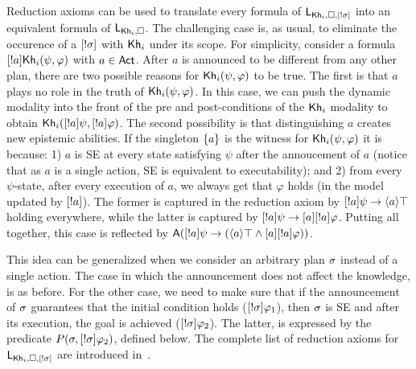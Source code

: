 Reduction axioms can be used to translate every formula of $\mathsf{L}_{{\sf Kh}_i,\square,[!\sigma]}$ into an equivalent formula of $\mathsf{L}_{{\sf Kh}_i,\square}$. The challenging case is, as usual, to eliminate the occurence of a $[!\sigma]$ with ${\sf Kh}_i$ under its scope. For simplicity, consider a formula $[!a]{\sf Kh}_i(\psi,\varphi)$ with $a\in{\rm \sf Act}$. After $a$ is announced to be different from any other plan, there are two possible reasons for ${\sf Kh}_i(\psi,\varphi)$ to be true. The first is that $a$ plays no role in the truth of ${\sf Kh}_i(\psi,\varphi)$. In this case, we can push the dynamic modality into the front of the pre and post-conditions of the ${\sf Kh}_i$ modality to obtain ${\sf Kh}_i([!a]\psi,[!a]\varphi)$. The second possibility is that distinguishing $a$ creates new epistemic abilities. If the singleton $\{ a \}$ is the witness for ${\sf Kh}_i(\psi,\varphi)$ it is because: 1) $a$ is SE at every state satisfying $\psi$ after the annoucement of $a$ (notice that as $a$ is a single action, SE is equivalent to executability); and 2) from every $\psi$-state, after every execution of $a$, we always get that $\varphi$ holds (in the model updated by $[!a]$). The former is captured in the reduction axiom by $[!a]\psi \rightarrow \langle a \rangle\top$ holding everywhere, while the latter is captured by $[!a]\psi \rightarrow [a][!a]\varphi$. Putting all together, this case is reflected by ${\sf A}([!a]\psi\rightarrow(\langle a \rangle\top\wedge[a][!a]\varphi))$.

This idea can be generalized when we consider an arbitrary plan $\sigma$ instead of a single action. The case in which the announcement does not affect the knowledge, is as before. For the other case, we need to make sure that if the announcement of $\sigma$ guarantees that the initial condition holds ($[!\sigma]\varphi_1$), then $\sigma$ is SE and after its execution, the goal is achieved ($[!\sigma]\varphi_2$). 
The latter, is expressed by the predicate $P(\sigma,[!\sigma]\varphi_2)$, defined below. The complete list of reduction axioms for $\mathsf{L}_{{\sf Kh}_i,\square,[!\sigma]}$ are introduced in~.

